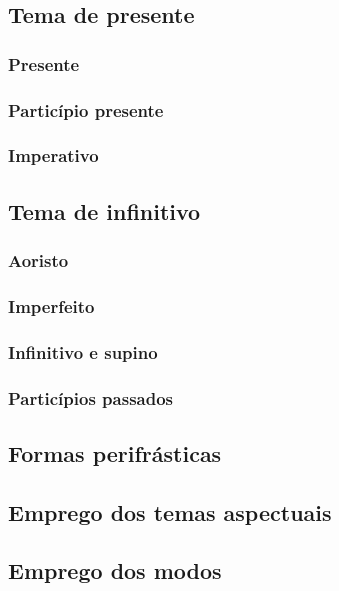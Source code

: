 \subsection{Tema de presente}
\lipsum[12]

\subsubsection{Presente}
\lipsum[11]

\subsubsection{Particípio presente}
\lipsum[10]

\subsubsection{Imperativo}
\lipsum[9]

\subsection{Tema de infinitivo}
\lipsum[8]

\subsubsection{Aoristo}
\lipsum[7]

\subsubsection{Imperfeito}
\lipsum[6]

\subsubsection{Infinitivo e supino}
\lipsum[5]

\subsubsection{Particípios passados}\label{sec:partpass}
\lipsum[4]

\subsection{Formas perifrásticas}
\lipsum[3]

\subsection{Emprego dos temas aspectuais}
\lipsum[2]

\subsection{Emprego dos modos}
\lipsum[1]
